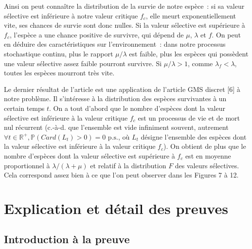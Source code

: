 \documentclass[12pt,a4paper]{article}
\begin{document}
Ainsi on peut connaître la distribution de la survie de notre espèce : si sa valeur sélective est inférieure à notre valeur critique $f_c$, elle meurt exponentiellement vite, ses chances de survie sont donc nulles. Si la valeur sélective est supérieure à $f_c$, l’espèce a une chance positive de survivre, qui dépend de $\mu$, $\lambda$ et $f$. 
On peut en déduire des caractéristiques sur l’environnement : dans notre processus stochastique continu, plus le rapport $\mu / \lambda$ est faible, plus les espèces qui possèdent une valeur sélective assez faible pourront survivre. Si $\mu / \lambda > 1$, comme $\lambda_f < \lambda$, toutes les espèces mourront très vite. \par
Le dernier résultat de l’article est une application de l’article GMS discret [6] à notre problème. Il s’intéresse à la distribution des espèces survivantes à un certain temps $t$. On a tout d’abord que le nombre d’espèces dont la valeur sélective est inférieure à la valeur critique $f_c$ est un processus de vie et de mort nul récurrent (c.-à-d. que l’ensemble est vide infiniment souvent, autrement $\forall t \in \mathbb{R}^+, \mathbb{P}(Card(L_t) > 0) = 0 \text{ p.s.}$, où $L_t$ désigne l'ensemble des espèces dont la valeur sélective est inférieure à la valeur critique $f_c$).
On obtient de plus que le nombre d’espèces dont la valeur sélective est supérieure à $f_c$ est en moyenne proportionnel à $\lambda/(\lambda+\mu)$ et relatif à la distribution $F$ des valeurs sélectives. Cela correspond assez bien à ce que l'on peut observer dans les Figures 7 à 12.

\section{Explication et détail des preuves}

\subsection{Introduction à la preuve}
\end{document}
